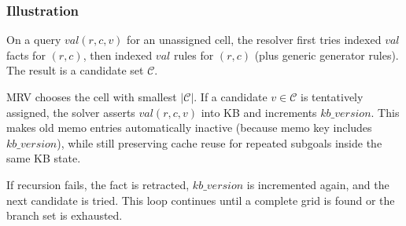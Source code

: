 \subsubsection{Illustration}
On a query $val(r,c,v)$ for an unassigned cell, the resolver first tries indexed $val$ facts for $(r,c)$, then indexed $val$ rules for $(r,c)$ (plus generic generator rules). The result is a candidate set $\mathcal{C}$.

MRV chooses the cell with smallest $|\mathcal{C}|$. If a candidate $v \in \mathcal{C}$ is tentatively assigned, the solver asserts $val(r,c,v)$ into KB and increments $kb\_version$. This makes old memo entries automatically inactive (because memo key includes $kb\_version$), while still preserving cache reuse for repeated subgoals inside the same KB state.

If recursion fails, the fact is retracted, $kb\_version$ is incremented again, and the next candidate is tried. This loop continues until a complete grid is found or the branch set is exhausted.

